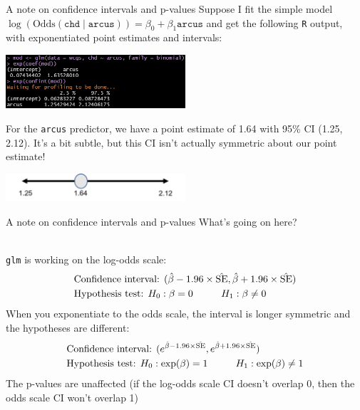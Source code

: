\documentclass[10pt,t]{beamer}
\newcommand\tab[1][1cm]{\hspace*{#1}}
\begin{document}
\begin{frame}{A note on confidence intervals and p-values}
	\vspace{-0.7cm}
	Suppose I fit the simple model $\log(\text{Odds}(\texttt{chd} \mid \texttt{arcus})) = \beta_0 + \beta_1 \texttt{arcus}$ and get the following \texttt{R} output, with exponentiated point estimates and intervals: 
	
	\begin{center}
	\includegraphics[width=0.5\textwidth]{./figs/asymmetric_CI}
	\end{center}
	For the \texttt{arcus} predictor, we have a point estimate of 1.64 with 95\% CI (1.25, 2.12). It's a bit subtle, but this CI isn't actually symmetric about our point estimate!
		\begin{center}
		\includegraphics[width=0.5\textwidth]{./figs/asymmetric_CI_pic}
	\end{center}
\end{frame}

\begin{frame}{A note on confidence intervals and p-values}
	What's going on here? 
	\\ ~\
	
	\texttt{glm} is working on the log-odds scale:
	\begin{align*}
		&\text{Confidence interval: }(\hat{\beta} - 1.96 \times \hat{\text{SE}}, \hat{\beta} + 1.96 \times \hat{\text{SE}})\\
		&\text{Hypothesis test: }H_0: \beta = 0 \tab H_1: \beta \neq 0
	\end{align*}
	When you exponentiate to the odds scale, the interval is longer symmetric and the hypotheses are different:
	\begin{align*}
		&\text{Confidence interval: }(e^{\hat{\beta} - 1.96 \times \hat{\text{SE}}}, e^{\hat{\beta} + 1.96 \times \hat{\text{SE}}})\\
		&\text{Hypothesis test: }H_0: \exp(\beta) = 1 \tab H_1: \exp(\beta) \neq 1
	\end{align*} 
	The p-values are unaffected (if the log-odds scale CI doesn't overlap 0, then the odds scale CI won't overlap 1)
\end{frame}
\end{document}
